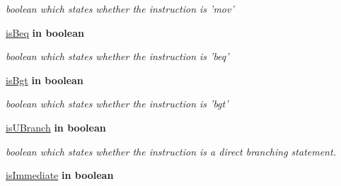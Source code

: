 \begin{DoxyCompactItemize}
\begin{DoxyCompactList}\small\item\em boolean which states whether the instruction is 'mov' \end{DoxyCompactList}\item 
\hypertarget{class_e_x_unit_acb82c0720fe8e01ce8dfd5412698f724}{\hyperlink{class_e_x_unit_acb82c0720fe8e01ce8dfd5412698f724}{is\-Beq}  {\bfseries {\bfseries \textcolor{vhdlkeyword}{in}\textcolor{vhdlchar}{ }}} {\bfseries \textcolor{comment}{boolean}\textcolor{vhdlchar}{ }} }\label{class_e_x_unit_acb82c0720fe8e01ce8dfd5412698f724}

\begin{DoxyCompactList}\small\item\em boolean which states whether the instruction is 'beq' \end{DoxyCompactList}\item 
\hypertarget{class_e_x_unit_a54b70f333bc66167d7af24c58cd6a779}{\hyperlink{class_e_x_unit_a54b70f333bc66167d7af24c58cd6a779}{is\-Bgt}  {\bfseries {\bfseries \textcolor{vhdlkeyword}{in}\textcolor{vhdlchar}{ }}} {\bfseries \textcolor{comment}{boolean}\textcolor{vhdlchar}{ }} }\label{class_e_x_unit_a54b70f333bc66167d7af24c58cd6a779}

\begin{DoxyCompactList}\small\item\em boolean which states whether the instruction is 'bgt' \end{DoxyCompactList}\item 
\hypertarget{class_e_x_unit_aea0608f12955e6a600f966b0ca7eb6d4}{\hyperlink{class_e_x_unit_aea0608f12955e6a600f966b0ca7eb6d4}{is\-U\-Branch}  {\bfseries {\bfseries \textcolor{vhdlkeyword}{in}\textcolor{vhdlchar}{ }}} {\bfseries \textcolor{comment}{boolean}\textcolor{vhdlchar}{ }} }\label{class_e_x_unit_aea0608f12955e6a600f966b0ca7eb6d4}

\begin{DoxyCompactList}\small\item\em boolean which states whether the instruction is a direct branching statement. \end{DoxyCompactList}\item 
\hypertarget{class_e_x_unit_acc89ba05f91483fee4568ed3da0305b6}{\hyperlink{class_e_x_unit_acc89ba05f91483fee4568ed3da0305b6}{is\-Immediate}  {\bfseries {\bfseries \textcolor{vhdlkeyword}{in}\textcolor{vhdlchar}{ }}} {\bfseries \textcolor{comment}{boolean}\textcolor{vhdlchar}{ }} }\label{class_e_x_unit_acc89ba05f91483fee4568ed3da0305b6}


\end{DoxyCompactItemize}
